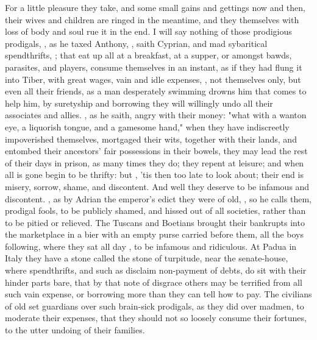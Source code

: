 For a little pleasure they take, and some small gains and gettings now and
then, their wives and children are ringed in the meantime, and they themselves
with loss of body and soul rue it in the end. I will say nothing of those
prodigious prodigals, , as he
taxed Anthony, , saith Cyprian, and mad
sybaritical spendthrifts, ; that eat
up all at a breakfast, at a supper, or amongst bawds, parasites, and players,
consume themselves in an instant, as if they had flung it into
Tiber, with great wages, vain and idle expenses, \etc{},
not themselves only, but even all their friends, as a man desperately swimming
drowns him that comes to help him, by suretyship and borrowing they will
willingly undo all their associates and allies. , as he saith, angry with their money: "what with
a wanton eye, a liquorish tongue, and a gamesome hand," when they have
indiscreetly impoverished themselves, mortgaged their wits, together with their
lands, and entombed their ancestors' fair possessions in their bowels, they may
lead the rest of their days in prison, as many times they do; they repent at
leisure; and when all is gone begin to be thrifty: but , 'tis then too late to look about; their end
is misery, sorrow, shame, and discontent. And well they deserve to be infamous
and discontent. , as by
Adrian the emperor's edict they were of old, , so
he calls them, prodigal fools, to be publicly shamed, and hissed out of all
societies, rather than to be pitied or relieved. The
Tuscans and Boetians brought their bankrupts into the marketplace in a bier
with an empty purse carried before them, all the boys following, where they sat
all day , to be infamous and ridiculous. At
Padua in Italy they have a stone called the stone of
turpitude, near the senate-house, where spendthrifts, and such as disclaim
non-payment of debts, do sit with their hinder parts bare, that by that note of
disgrace others may be terrified from all such vain expense, or borrowing more
than they can tell how to pay. The civilians of old set
guardians over such brain-sick prodigals, as they did over madmen, to moderate
their expenses, that they should not so loosely consume their fortunes, to the
utter undoing of their families.

